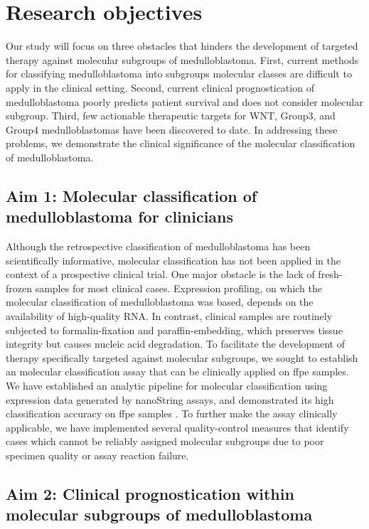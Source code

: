 \section{Research objectives}

Our study will focus on three obstacles that hinders the development of targeted therapy against molecular subgroups of medulloblastoma. First, current methods for classifying medulloblastoma into subgroups molecular classes are difficult to apply in the clinical setting. Second, current clinical prognostication of medulloblastoma poorly predicts patient survival and does not consider molecular subgroup. Third, few actionable therapeutic targets for WNT, Group3, and Group4 medulloblastomas have been discovered to date. In addressing these problems, we demonstrate the clinical significance of the molecular classification of medulloblastoma.

\subsection*{Aim 1: Molecular classification of medulloblastoma for clinicians}

Although the retrospective classification of medulloblastoma has been scientifically informative, molecular classification has not been applied in the context of a prospective clinical trial. One major obstacle is the lack of fresh-frozen samples for most clinical cases. Expression profiling, on which the molecular classification of medulloblastoma was based, depends on the availability of high-quality RNA. In contrast, clinical samples are routinely subjected to formalin-fixation and paraffin-embedding, which preserves tissue integrity but causes nucleic acid degradation. To facilitate the development of therapy specifically targeted against molecular subgroups, we sought to establish an molecular classification assay that can be clinically applied on \gls{ffpe} samples. We have established an analytic pipeline for molecular classification using expression data generated by nanoString assays, and demonstrated its high classification accuracy on \gls{ffpe} samples . To further make the assay clinically applicable, we have implemented several quality-control measures that identify cases which cannot be reliably assigned molecular subgroups due to poor specimen quality or assay reaction failure.

\subsection*{Aim 2: Clinical prognostication within molecular subgroups of medulloblastoma}


